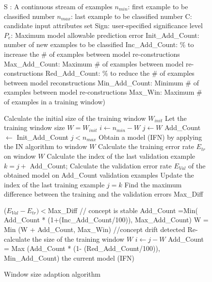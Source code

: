 \BEGINOMIT
\begin{figure}
\begin{codebox}

\zi S : A continuous stream of examples
\zi $n_{min}$: first example to be classified number
\zi $n_{max}$: last example to be classified number
\zi C: candidate input attributes set 
\zi Sign: user-specified significance level
\zi $P_e$: Maximum model allowable prediction error
\zi Init\_Add\_Count: number of new examples to be classified 
\zi Inc\_Add\_Count: \% to increase the \# of examples between model re-constructions
\zi Max\_Add\_Count: Maximum \# of examples between model re-constructions
\zi Red\_Add\_Count: \% to reduce the \# of examples between model reconstructions
\zi Min\_Add\_Count: Minimum \# of examples between model re-constructions
\zi Max\_Win: Maximum \# of examples in a training window)

\li  Calculate the initial size of the training window $W_{init}$ 
\li  Let the training window size $W = W_{init}$
\li  $i \gets n_{min} - W$
\li  $j \gets W$
\li  Add\_Count $\gets$ Init\_Add\_Count
\li  \While $j < n_{max}$
\li \Do
\li  Obtain a model (IFN) by applying the IN algorithm to window $W$ %
\li  Calculate the training error rate $E_{tr}$ on window $W$ %
\li  Calculate the index of the last validation example $k = j +$ Add\_Count;
\li  Calculate the validation error rate $E_{Val}$ of the obtained model 
\li       on Add\_Count validation examples
\li  Update the index of the last training example $j = k$
\li  Find the maximum difference between the training and the validation errors Max\_Diff

\li \If ($E_{Val} - E_{tr}) < $Max\_Diff 
\li \Then  // concept is stable 
\li Add\_Count =Min( Add\_Count * (1+(Inc\_Add\_Count/100)), Max\_Add\_Count)
\li W = Min (W + Add\_Count, Max\_Win)
\li \Else //concept drift detected
\li  Re-calculate the size of the training window $W$ 
\li   $i \gets j - W$
\li  Add\_Count = Max (Add\_Count * (1- (Red\_Add\_Count/100)), Min\_Add\_Count)
\End  
\li \Return the current model (IFN)
\End
\end{codebox}

\caption{Window size adaption algorithm}
\label{Fig:OLIN}
\end{figure}
\ENDOMIT


